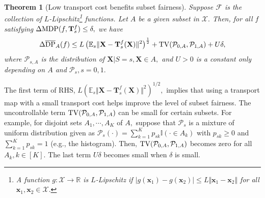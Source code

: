 \documentclass[10pt]{article} %
\newtheorem{theorem}{Theorem}[section]
\begin{document}
\begin{theorem}[Low transport cost benefits subset fairness]\label{thm:subset}
    Suppose $\mathcal{F}$ is the collection of $L$-Lipschitz\footnote{A function $g: \mathcal{X} \rightarrow \mathbb{R}$ is $L$-Lipschitz if $\vert g(\mathbf{x}_{1}) - g(\mathbf{x}_{2}) \vert \le L \Vert \mathbf{x}_{1} - \mathbf{x}_{2} \Vert$ for all $\mathbf{x}_{1}, \mathbf{x}_{2} \in \mathcal{X}.$} functions.
    Let $A$ be a given subset in $\mathcal{X}.$
    Then, for all $f$ satisfying $\Delta \textup{MDP} (f, \mathbf{T}_{s}^{f}) \le \delta,$ we have
    \begin{equation}
        \begin{split}
            \Delta \overline{\textup{DP}}_{A} (f) 
            \le L \left( \mathbb{E}_{s} \Vert \mathbf{X} - \mathbf{T}_{s}^{f}(\mathbf{X}) \Vert^{2} \right)^{ \frac{1}{2} }
            + \textup{TV}(\mathcal{P}_{0, A}, \mathcal{P}_{1, A}) + U \delta,
        \end{split}
    \end{equation}
    where $\mathcal{P}_{s, A}$ is the distribution of $\mathbf{X} | S = s, \mathbf{X} \in A,$
    and $U > 0$ is a constant only depending on $A$ and $\mathcal{P}_{s}, s=0,1.$
\end{theorem}


The first term of RHS, $L \left( \mathbb{E}_{s} \Vert \mathbf{X} - \mathbf{T}_{s}^{f}(\mathbf{X}) \Vert^{2} \right)^{1/2},$ implies that using a transport map with a small transport cost helps improve the level of subset fairness. 
The uncontrollable term $\textup{TV}(\mathcal{P}_{0, A}, \mathcal{P}_{1, A})$ can be small for certain subsets. 
For example, for disjoint sets $A_{1}, \cdots, A_{K}$ of $A,$ suppose that $\mathcal{P}_s$ is a mixture of uniform distribution given as
$\mathcal{P}_s(\cdot)=\sum_{k=1}^K p_{sk} \mathbb{I}(\cdot\in A_k)$ with $p_{sk}\ge 0$ and $\sum_{k=1}^K p_{sk}=1$ (e.g., the histogram).
Then, $\textup{TV}(\mathcal{P}_{0, A}, \mathcal{P}_{1, A})$ becomes zero for all $A_{k}, k \in [K].$
The last term $U \delta$ becomes small when $\delta$ is small.

\end{document}
